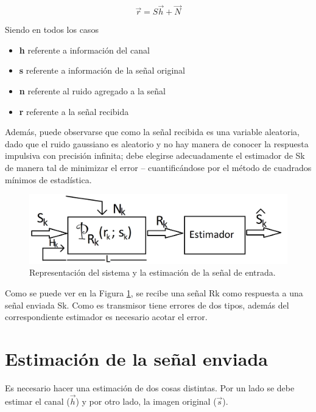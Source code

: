 \begin{equation} 
\vec{r} = S \vec{h} + \vec{N} 
\label{eq: r=sh+n}
\end{equation} 

Siendo en todos los casos 
\begin{itemize}
	\item \textbf{h} referente a informaci\'on del canal
	\item \textbf{s} referente a información de la se\~nal original
	\item \textbf{n} referente al ruido agregado a la señal
	\item \textbf{r} referente a la se\~nal recibida
\end{itemize}
	
Adem\'as, puede observarse que como la se\~nal recibida es una variable aleatoria, dado que el ruido gaussiano es aleatorio y no hay manera de conocer la respuesta impulsiva con precisi\'on infinita; debe elegirse adecuadamente el estimador de Sk de manera tal de minimizar el error – cuantific\'andose por el m\'etodo de cuadrados m\'inimos de estad\'istica.

\begin{figure}[H]
	\includegraphics[scale=0.15]{Imagenes/sistema}
	\centering
	\caption {Representaci\'on del sistema y la estimaci\'on de la se\~nal de entrada.}
	\label{sistema}
\end{figure}

Como se puede ver en la Figura \ref{sistema}, se recibe una se\~nal Rk como respuesta a una se\~nal enviada Sk. Como es transmisor tiene errores de dos tipos, adem\'as del correspondiente estimador es necesario acotar el error.

\section{Estimaci\'on de la se\~nal enviada}

Es necesario hacer una estimaci\'on de dos cosas distintas. Por un lado se debe estimar el canal ($\vec{h}$) y por otro lado, la imagen original  ($\vec{s}$).

